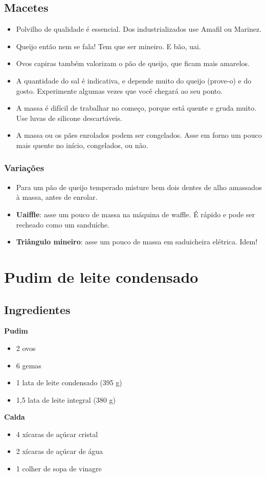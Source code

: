 \subsection*{Macetes}
\begin{itemize}
\item Polvilho de qualidade é essencial. Dos industrializados use Amafil ou Marinez.
\item Queijo então nem se fala! Tem que ser mineiro. E bão, uai.
\item Ovos capiras também valorizam o pão de queijo, que ficam mais amarelos.
\item A quantidade do sal é indicativa, e depende muito do queijo (prove-o) e do gosto. Experimente algumas vezes que você chegará ao seu ponto.
\item A massa é difícil de trabalhar no começo, porque está quente e gruda muito. Use luvas de silicone descartáveis.
\item A massa ou os pães enrolados podem ser congelados. Asse em forno um pouco mais quente no início, congelados, ou não.
\end{itemize}

\subsubsection*{Variações}
\begin{itemize}
\item Para um pão de queijo temperado misture bem dois dentes de alho amassados à massa, antes de enrolar.
\item \textbf{Uaiffle}: asse um pouco de massa na máquina de waffle. É rápido e pode ser recheado como um sanduíche.
\item \textbf{Triângulo mineiro}: asse um pouco de massa em saduicheira elétrica. Idem!
\end{itemize}

\section{Pudim de leite condensado}
\subsection{Ingredientes}
\textbf{Pudim}
\begin{itemize}
\item 2 ovos
\item 6 gemas
\item 1 lata de leite condensado (395 g)
\item 1,5 lata de leite integral (380 g)
\end{itemize}
\textbf{Calda}
\begin{itemize}
\item 4 xícaras de açúcar cristal
\item 2 xícaras de açúcar de água
\item 1 colher de sopa de vinagre
\end{itemize}
